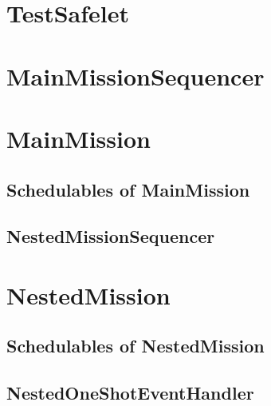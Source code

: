\documentclass[10pt,a4paper,final]{article}
\begin{document}
\section{TestSafelet}

\newpage

\section{MainMissionSequencer}

\newpage

\section{MainMission}

\newpage

\subsection{Schedulables of MainMission}

\subsection{NestedMissionSequencer}

\newpage


\section{NestedMission}

\newpage

\subsection{Schedulables of NestedMission}

\subsection{NestedOneShotEventHandler}

\newpage
\end{document}
